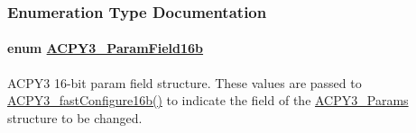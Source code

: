 \subsubsection{Enumeration Type Documentation}
\hypertarget{group___d_s_p_a_c_p_y3_gf9624d3d925ec0d15bd845967664e608}{
\paragraph[ACPY3\_\-ParamField16b]{\setlength{\rightskip}{0pt plus 5cm}enum \hyperlink{group___d_s_p_a_c_p_y3_gf9624d3d925ec0d15bd845967664e608}{ACPY3\_\-Param\-Field16b}}\hfill}
\label{group___d_s_p_a_c_p_y3_gf9624d3d925ec0d15bd845967664e608}


ACPY3 16-bit param field structure. These values are passed to \hyperlink{group___d_s_p_a_c_p_y3_g2c54ca4dc3d0cf3f861259bc7cf0f8de}{ACPY3\_\-fast\-Configure16b()} to indicate the field of the \hyperlink{struct_a_c_p_y3___params}{ACPY3\_\-Params} structure to be changed. 

